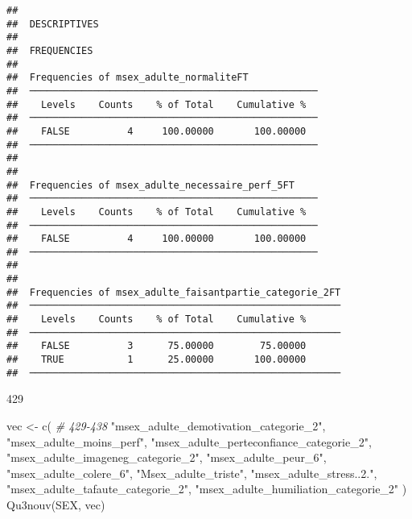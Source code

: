 \documentclass[
]{article}
\newenvironment{Shaded}{\begin{snugshade}}{\end{snugshade}}
\newcommand{\CommentTok}[1]{\textcolor[rgb]{0.56,0.35,0.01}{\textit{#1}}}
\newcommand{\FunctionTok}[1]{\textcolor[rgb]{0.00,0.00,0.00}{#1}}
\newcommand{\NormalTok}[1]{#1}
\newcommand{\OtherTok}[1]{\textcolor[rgb]{0.56,0.35,0.01}{#1}}
\newcommand{\StringTok}[1]{\textcolor[rgb]{0.31,0.60,0.02}{#1}}
\begin{document}
\begin{verbatim}
## 
##  DESCRIPTIVES
## 
##  FREQUENCIES
## 
##  Frequencies of msex_adulte_normaliteFT             
##  ────────────────────────────────────────────────── 
##    Levels    Counts    % of Total    Cumulative %   
##  ────────────────────────────────────────────────── 
##    FALSE          4     100.00000       100.00000   
##  ────────────────────────────────────────────────── 
## 
## 
##  Frequencies of msex_adulte_necessaire_perf_5FT     
##  ────────────────────────────────────────────────── 
##    Levels    Counts    % of Total    Cumulative %   
##  ────────────────────────────────────────────────── 
##    FALSE          4     100.00000       100.00000   
##  ────────────────────────────────────────────────── 
## 
## 
##  Frequencies of msex_adulte_faisantpartie_categorie_2FT 
##  ────────────────────────────────────────────────────── 
##    Levels    Counts    % of Total    Cumulative %   
##  ────────────────────────────────────────────────────── 
##    FALSE          3      75.00000        75.00000   
##    TRUE           1      25.00000       100.00000   
##  ──────────────────────────────────────────────────────
\end{verbatim}

429

\begin{Shaded}
\begin{Highlighting}[]
\NormalTok{vec }\OtherTok{\textless{}{-}} \FunctionTok{c}\NormalTok{(  }\CommentTok{\# 429{-}438}
  \StringTok{"msex\_adulte\_demotivation\_categorie\_2"}\NormalTok{,}
  \StringTok{"msex\_adulte\_moins\_perf"}\NormalTok{,}
  \StringTok{"msex\_adulte\_perteconfiance\_categorie\_2"}\NormalTok{,}
  \StringTok{"msex\_adulte\_imageneg\_categorie\_2"}\NormalTok{,}
  \StringTok{"msex\_adulte\_peur\_6"}\NormalTok{,}
  \StringTok{"msex\_adulte\_colere\_6"}\NormalTok{,}
  \StringTok{"Msex\_adulte\_triste"}\NormalTok{,}
  \StringTok{"msex\_adulte\_stress..2."}\NormalTok{,}
  \StringTok{"msex\_adulte\_tafaute\_categorie\_2"}\NormalTok{,}
  \StringTok{"msex\_adulte\_humiliation\_categorie\_2"}
\NormalTok{  )}
\FunctionTok{Qu3nouv}\NormalTok{(SEX, vec)}
\end{Highlighting}
\end{Shaded}
\end{document}
